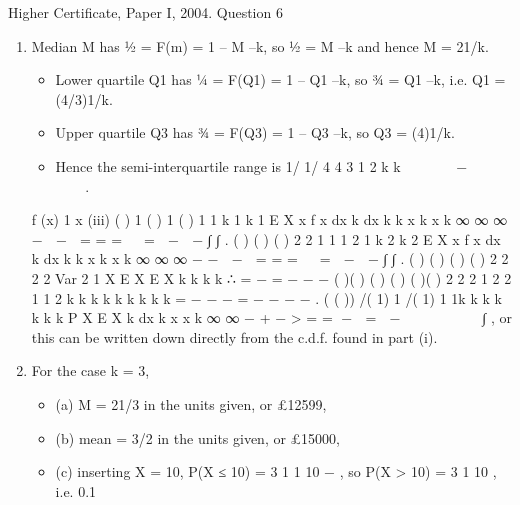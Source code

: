 \documentclass[a4paper,12pt]{article}
\begin{document}
Higher Certificate, Paper I, 2004. Question 6
\begin{enumerate}
( ) 1, 1; 0 k
f x k x k
x + = ≥ >
(i) Sketch of f (x).
[NOTE. The curve should of course appear as a smooth curve; it might not do so,
due to the limits of electronic reproduction.]
C.d.f. is ( ) ( ) 1 1
1
1 1 1
x
x
k k k
F x P X x k du
u + u x
= ≤ = = −  = −   ∫ (for x ≥ 1).
\item  Median M has ½ = F(m) = 1 – M –k, so ½ = M –k and hence M = 21/k.
\begin{itemize}
    \item Lower quartile Q1 has ¼ = F(Q1) = 1 – Q1
–k, so ¾ = Q1
–k, i.e. Q1 = (4/3)1/k.
\item Upper quartile Q3 has ¾ = F(Q3) = 1 – Q3
–k, so Q3 = (4)1/k.
\item Hence the semi-interquartile range is
1/
1/ 4
4
3
1
2
k
k      −   
   
.
\end{itemize}


f (x)
1 x
(iii) ( ) 1 ( ) 1 ( ) 1
1 k 1 k 1
E X x f x dx k dx k k
x k x k
∞
∞ ∞
−
 −  = = =   =  −  −
∫ ∫ .
( ) ( ) ( )
2 2
1 1 1 2
1 k 2 k 2
E X x f x dx k dx k k
x k x k
∞
∞ ∞
− −
 −  = = =   =  −  −
∫ ∫ .
( ) ( ) { ( )} ( )
2
2 2
2 Var
2 1
X E X E X k k
k k
∴ = − = −
− −
( )( )
{( ) ( )} ( )( )
2
2 2 1 2
2 1 1 2
k k k k k
k k k k
= − − − =
− − − −
.
( ( )) /( 1) 1
/( 1)
1 1k
k k k k
k k
P X E X k dx k
x x k
∞
∞
− +
−
> = = −  =  −          ∫ , or this can be written down
directly from the c.d.f. found in part (i).
\item  For the case k = 3,
\begin{itemize}
\item (a) M = 21/3 in the units given, or £12599,
\item (b) mean = 3/2 in the units given, or £15000,
\item (c) inserting X = 10, P(X ≤ 10) = 3
1 1
10
− , so P(X > 10) = 3
1
10
, i.e. 0.1%
\end{itemize}
\end{enumerate}
\end{document}
